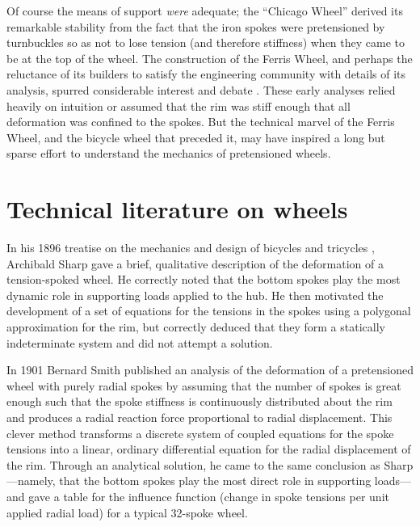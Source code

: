 \documentclass[../thesis.tex]{subfiles}
\begin{document}
Of course the means of support \emph{were} adequate; the ``Chicago Wheel'' derived its remarkable stability from the fact that the iron spokes were pretensioned by turnbuckles so as not to lose tension (and therefore stiffness) when they came to be at the top of the wheel. The construction of the Ferris Wheel, and perhaps the reluctance of its builders to satisfy the engineering community with details of its analysis, spurred considerable interest and debate \cite{FerrisWheelDiscussion,Searles1893}. These early analyses relied heavily on intuition or assumed that the rim was stiff enough that all deformation was confined to the spokes. But the technical marvel of the Ferris Wheel, and the bicycle wheel that preceded it, may have inspired a long but sparse effort to understand the mechanics of pretensioned wheels.


\section{Technical literature on wheels}

In his 1896 treatise on the mechanics and design of bicycles and tricycles \cite{Sharp1977}, Archibald Sharp gave a brief, qualitative description of the deformation of a tension-spoked wheel. He correctly noted that the bottom spokes play the most dynamic role in supporting loads applied to the hub. He then motivated the development of a set of equations for the tensions in the spokes using a polygonal approximation for the rim, but correctly deduced that they form a statically indeterminate system and did not attempt a solution.

In 1901 Bernard Smith \cite{Smith1901} published an analysis of the deformation of a pretensioned wheel with purely radial spokes by assuming that the number of spokes is great enough such that the spoke stiffness is continuously distributed about the rim and produces a radial reaction force proportional to radial displacement. This clever method transforms a discrete system of coupled equations for the spoke tensions into a linear, ordinary differential equation for the radial displacement of the rim. Through an analytical solution, he came to the same conclusion as Sharp---namely, that the bottom spokes play the most direct role in supporting loads---and gave a table for the influence function (change in spoke tensions per unit applied radial load) for a typical 32-spoke wheel.
\end{document}
